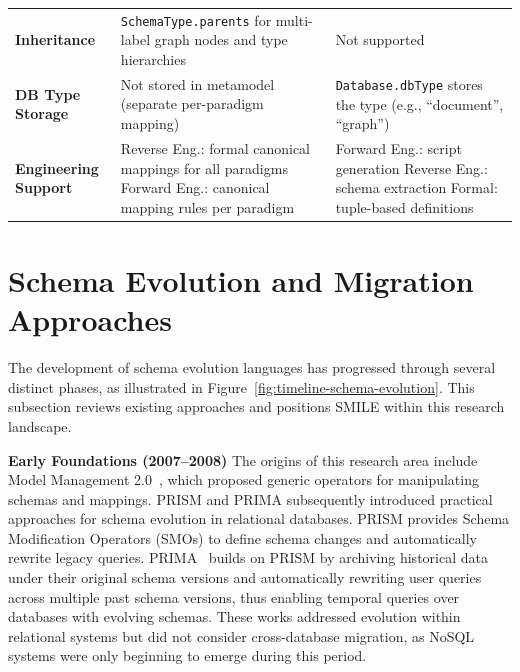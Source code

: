 \begin{longtable}{@{} >{\raggedright\arraybackslash\bfseries}p{} >{\raggedright\arraybackslash}p{}
  >{\raggedright\arraybackslash}p{} @{}}
  Inheritance &
  \texttt{SchemaType.parents} for multi-label graph nodes and type hierarchies &
  Not supported \\

  DB Type Storage &
  Not stored in metamodel (separate per-paradigm mapping) &
  \texttt{Database.dbType} stores the type (e.g., ``document'', ``graph'') \\

  Engineering Support &
  Reverse Eng.: formal canonical mappings for all paradigms \newline Forward Eng.: canonical mapping rules per paradigm &
  Forward Eng.: script generation \newline Reverse Eng.: schema extraction \newline Formal: tuple-based definitions \\

  \end{longtable}
  \endgroup

%
%
\section{Schema Evolution and Migration Approaches}
\label{sec:stateoftheart:evolution}


The development of schema evolution languages has progressed through several distinct phases, as illustrated in Figure~\ref{fig:timeline-schema-evolution}. This subsection reviews existing approaches and positions SMILE  within this research landscape.

\textbf{Early Foundations (2007--2008)} The origins of this research area include Model Management 2.0~\cite{bernstein2007model}, which proposed generic operators for manipulating schemas and mappings. PRISM \cite{curino2008graceful} and PRIMA \cite{moon2009prima} subsequently introduced practical approaches for schema evolution in relational databases. PRISM provides Schema Modification Operators (SMOs) to define schema changes and automatically rewrite legacy queries. PRIMA~\cite{moon2009prima}  builds on PRISM by archiving historical data under their original schema versions and automatically rewriting user queries across multiple past schema versions, thus enabling temporal queries over databases with evolving schemas. These works addressed evolution within relational systems but did not consider cross-database migration, as NoSQL systems were only beginning to emerge during this period.

